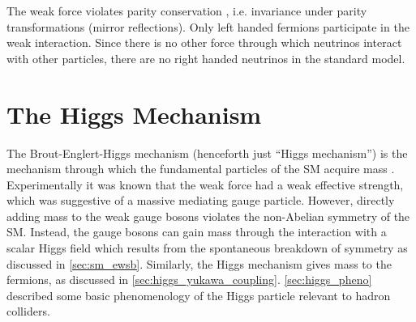 The weak force violates parity conservation \cite{PhysRev.104.254,PhysRev.105.1413,PhysRev.105.1415}, i.e. invariance under parity transformations (mirror reflections).
Only left handed fermions participate in the weak interaction.
Since there is no other force through which neutrinos interact with other particles, there are no right handed neutrinos in the standard model.






\section{The Higgs Mechanism}\label{sec:sm_higgs}

The Brout-Englert-Higgs mechanism (henceforth just ``Higgs mechanism'') is the mechanism through which the fundamental particles of the SM acquire mass \cite{Englert:1964et,Higgs:1964pj,Guralnik:1964eu}.
Experimentally it was known that the weak force had a weak effective strength, which was suggestive of a massive mediating gauge particle.
However, directly adding mass to the weak gauge bosons violates the non-Abelian symmetry of the SM.
Instead, the gauge bosons can gain mass through the interaction with a scalar Higgs field which results from the spontaneous breakdown of symmetry as discussed in \cref{sec:sm_ewsb}.
Similarly, the Higgs mechanism gives mass to the fermions, as discussed in \cref{sec:higgs_yukawa_coupling}.
\cref{sec:higgs_pheno} described some basic phenomenology of the Higgs particle relevant to hadron colliders.


